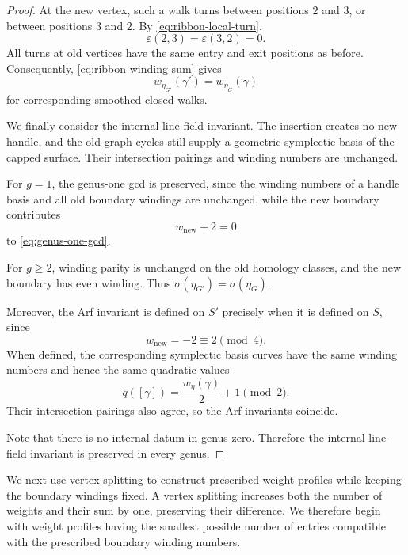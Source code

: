 \documentclass[11pt]{amsart}
\theoremstyle{definition}
\theoremstyle{plain}
\theoremstyle{definition}
\theoremstyle{definition}
\begin{document}
\begin{proof}
At the new vertex, such a walk turns between positions
$2$ and $3$, or between positions $3$ and $2$.  By
\eqref{eq:ribbon-local-turn},
\[
  \varepsilon(2,3)=\varepsilon(3,2)=0.
\]
All turns at old vertices have the same entry and exit
positions as before.  Consequently,
\eqref{eq:ribbon-winding-sum} gives
\[
  w_{\eta_{G'}}(\gamma')
  =w_{\eta_G}(\gamma)
\]
for corresponding smoothed closed walks.

We finally consider the internal line-field invariant.
The insertion creates no new handle, and the old graph
cycles still supply a geometric symplectic basis of the
capped surface.  Their intersection pairings and winding
numbers are unchanged.

For $g=1$, the genus-one gcd is preserved, since the
winding numbers of a handle basis and all old boundary
windings are unchanged, while the new boundary contributes
\[
  w_{\mathrm{new}}+2=0
\]
to \eqref{eq:genus-one-gcd}.

For $g\geq2$, winding parity is unchanged on the old
homology classes, and the new boundary has even winding.
Thus $\sigma(\eta_{G'})=\sigma(\eta_G)$.

Moreover, the Arf invariant is defined on $S'$ precisely
when it is defined on $S$, since
\[
  w_{\mathrm{new}}=-2\equiv2\pmod4.
\]
When defined, the corresponding symplectic basis curves
have the same winding numbers and hence the same quadratic
values
\[
  q([\gamma])
  =\frac{w_\eta(\gamma)}2+1\pmod2.
\]
Their intersection pairings also agree, so the Arf
invariants coincide.

Note that there is no internal datum in genus zero.  Therefore
the internal line-field invariant is preserved in
every genus.
\end{proof}

We next use vertex splitting to construct prescribed weight
profiles while keeping the boundary windings fixed.
A vertex splitting increases both the number of weights
and their sum by one, preserving their difference.
We therefore begin with weight profiles having the smallest possible
number of entries compatible with the prescribed boundary winding numbers.
\end{document}
